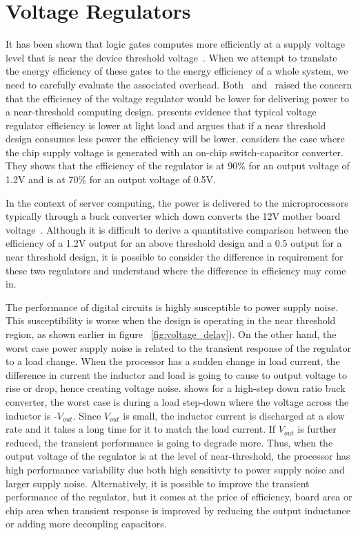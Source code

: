 \section{Voltage Regulators}

It has been shown that logic gates computes more efficiently at a supply voltage level
that is near the device threshold voltage~\cite{Dreslinski:2010ez}. When we attempt to translate the
energy efficiency of these gates to the energy efficiency of a whole system, we
need to carefully evaluate the associated overhead.
Both~\cite{ISLPED:2011}
and~\cite{Pitfall:2010} raised the concern that the efficiency
of the voltage regulator would be lower for delivering power to a near-threshold
computing design. \cite{ISLPED:2011} presents evidence that
typical voltage regulator efficiency is lower at light load and argues that if a
near threshold design consumes less power the efficiency will be lower.
\cite{Pitfall:2010} considers the case where the chip supply
voltage is generated with an on-chip switch-capacitor converter. They shows that
the efficiency of the regulator is at 90\% for an output voltage of 1.2V and is
at 70\% for an output voltage of 0.5V.

In the context of server computing, the power is delivered to the
microprocessors typically through a buck converter which down converts the 12V
mother board voltage~\cite{Server:2006}. Although it is
difficult to derive a quantitative comparison between the efficiency of a 1.2V
output for an above threshold design and a 0.5 output for a near threshold
design, it is possible to consider the difference in requirement for these two
regulators and understand where the difference in efficiency may come in. 

The performance of digital circuits is highly susceptible to power supply noise.
This susceptibility is worse when the design is operating in the near threshold
region, as shown earlier in figure ~\ref{fig:voltage_delay}). On the other hand,
the worst case power supply noise is related to the transient response of the regulator to a load change. When the processor has a sudden change in load current,  the difference in current the inductor and load is going to cause to output voltage to rise or drop, hence creating voltage noise. \cite{Transient} shows for a high-step down ratio buck converter, the worst case is during a load step-down where the voltage across the inductor is -$V_{out}$. Since $V_{out}$ is small, the inductor current is discharged at a slow rate and it takes a long time for it to match the load current. If  $V_{out}$ is further reduced, the transient performance is going to degrade more. Thus, when the output voltage of the regulator is at the level of near-threshold, the processor has high performance variability due both high sensitivty to power supply noise and  larger supply noise. 
Alternatively, it is possible to  improve the transient performance of the regulator, but it comes at the price of efficiency, board area
or chip area when transient response is improved by reducing the output inductance or adding more decoupling capacitors.

